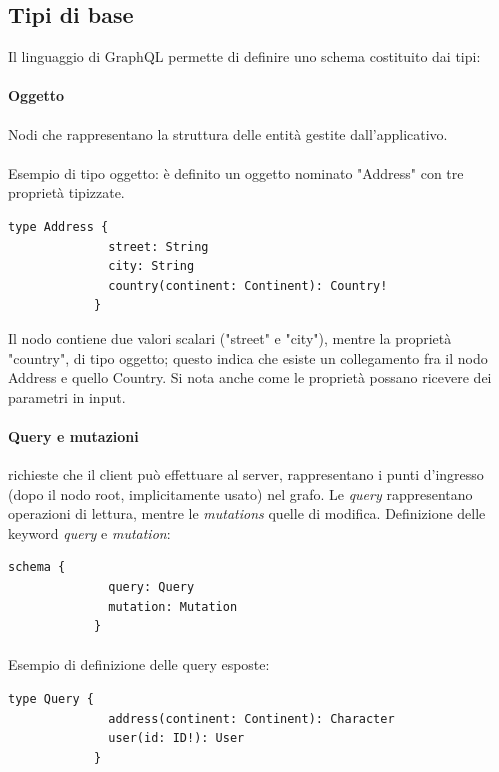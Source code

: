 \documentclass[a4paper, 12pt]{report}
\begin{document}
      \subsection{Tipi di base}
      Il linguaggio di GraphQL permette di definire uno schema costituito dai tipi:
        \paragraph*{Oggetto} 
          Nodi che rappresentano la struttura delle entità gestite dall'applicativo.
        \paragraph*{}
          Esempio di tipo oggetto: è definito un oggetto nominato "Address" con tre proprietà tipizzate.
          \begin{Verbatim}[samepage=true]
            type Address {
              street: String
              city: String
              country(continent: Continent): Country!
            }
          \end{Verbatim}
          Il nodo contiene due valori scalari ("street" e "city"), mentre la proprietà "country", di tipo oggetto; questo indica che esiste un collegamento fra il nodo Address e quello Country. Si nota anche come le proprietà possano ricevere dei parametri in input.
        \paragraph*{Query e mutazioni} 
          richieste che il client può effettuare al server, rappresentano i punti d'ingresso (dopo il nodo root, implicitamente usato) nel grafo. Le \emph{query} rappresentano operazioni di lettura, mentre le \emph{mutations} quelle di modifica.
          Definizione delle keyword \emph{query} e \emph{mutation}:
          \begin{Verbatim}[samepage=true]
            schema {
              query: Query
              mutation: Mutation
            }
          \end{Verbatim}
        \paragraph*{}
          Esempio di definizione delle query esposte:
          \begin{Verbatim}[samepage=true]
            type Query {
              address(continent: Continent): Character
              user(id: ID!): User
            }
          \end{Verbatim}
\end{document}
